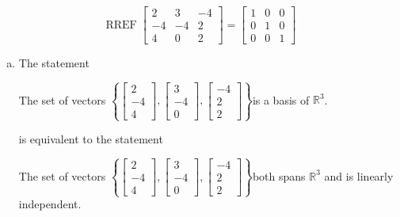 \begin{exerciseAnswer} 


\[\operatorname{RREF} \left[\begin{array}{ccc}
2 & 3 & -4 \\
-4 & -4 & 2 \\
4 & 0 & 2
\end{array}\right] = \left[\begin{array}{ccc}
1 & 0 & 0 \\
0 & 1 & 0 \\
0 & 0 & 1
\end{array}\right] \]


\begin{enumerate}[(a)]
\item The statement 
\begin{center}\begin{minipage}{0.8\textwidth}
 The set of vectors \( \left\{ \left[\begin{array}{c}
2 \\
-4 \\
4
\end{array}\right] , \left[\begin{array}{c}
3 \\
-4 \\
0
\end{array}\right] , \left[\begin{array}{c}
-4 \\
2 \\
2
\end{array}\right] \right\} \)is a basis of \(\mathbb{R}^3\). 
\end{minipage}\end{center}
     is equivalent to the statement 
\begin{center}\begin{minipage}{0.8\textwidth}
 The set of vectors \( \left\{ \left[\begin{array}{c}
2 \\
-4 \\
4
\end{array}\right] , \left[\begin{array}{c}
3 \\
-4 \\
0
\end{array}\right] , \left[\begin{array}{c}
-4 \\
2 \\
2
\end{array}\right] \right\} \)both spans \(\mathbb{R}^3\) and is linearly independent.
\end{minipage}\end{center}
    

\end{enumerate}
\end{exerciseAnswer}
